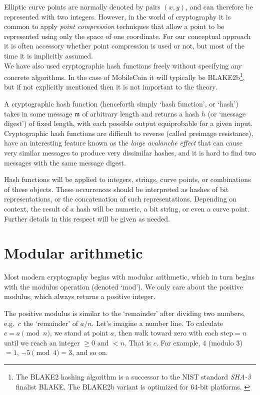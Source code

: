 Elliptic curve points are normally denoted by pairs \((x, y)\), and can therefore be represented with two integers. However, in the world of cryptography it is common to apply {\em point compression} techniques that allow a point to be represented using only the space of one coordinate. For our conceptual approach it is often accessory whether point compression is used or not, but most of the time it is implicitly assumed.\\

We have also used cryptographic hash functions freely without specifying any concrete algorithms. In the case of MobileCoin it will typically be BLAKE2b\footnote{The BLAKE2 hashing algorithm is a successor to the NIST standard {\em SHA-3} \cite{nist-sha3} finalist BLAKE. The BLAKE2b variant is optimized for 64-bit platforms. \cite{blake2-paper}}, but if not explicitly mentioned then it is not important to the theory. 

A cryptographic hash function (henceforth simply `hash function', or `hash') takes in some message $\mathfrak{m}$ of arbitrary length and returns a hash $h$ (or `message digest') of fixed length, with each possible output equiprobable for a given input. Cryptographic hash functions are difficult to reverse (called preimage resistance), have an interesting feature known as the {\em large avalanche effect} that can cause very similar messages to produce very dissimilar hashes, and it is hard to find two messages with the same message digest.

Hash functions will be applied to integers, strings, curve points, or combinations of these objects. These occurrences should be interpreted as hashes of bit representations, or the concatenation of such representations. Depending on context, the result of a hash will be numeric, a bit string, or even a curve point. Further details in this respect will be given as needed.



\section{Modular arithmetic}
\label{sec:modular-arithmetic}

Most modern cryptography begins with modular arithmetic, which in turn begins with the modulus operation (denoted `mod'). We only care about the positive modulus, which always returns a positive integer.

The positive modulus is similar to the `remainder' after dividing two numbers, e.g.\ $c$ the `remainder' of $a/n$. Let's imagine a number line. To calculate $c = a \pmod n$, we stand at point $a$, then walk toward zero with each $\text{step} = n$ until we reach an integer $\geq{0}$ and $< n$. That is $c$. For example, $4$ (modulo 3) $= 1$, $-5 \pmod 4 = 3$, and so on.

